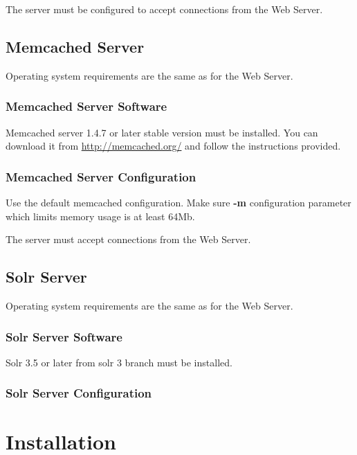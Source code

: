 \documentclass[12pt]{article}
\newcommand{\vigShowNotes}{1}
\newcommand{\todo}[1]{\ifthenelse{\vigShowNotes=1}{
\textbf{TODO:} 
\textcolor{Red}{
#1
}
}{}}
\begin{document}
The server must be configured to accept connections from the Web Server.

\subsection{Memcached Server}
Operating system requirements are the same as for the Web Server.

\subsubsection{Memcached Server Software}

Memcached server 1.4.7 or later stable version must be installed. You can download it from \url{http://memcached.org/} and follow the instructions provided.

\subsubsection{Memcached Server Configuration}

Use the default memcached configuration. Make sure \textbf{-m} configuration parameter which limits memory usage is at least 64Mb.

The server must accept connections from the Web Server.

\subsection{Solr Server}
Operating system requirements are the same as for the Web Server.

\subsubsection{Solr Server Software}

Solr 3.5 or later from solr 3 branch must be installed.

\todo{More solr installation notes}

\subsubsection{Solr Server Configuration}

\todo{More solr configuration notes}

\section{Installation}
\end{document}
